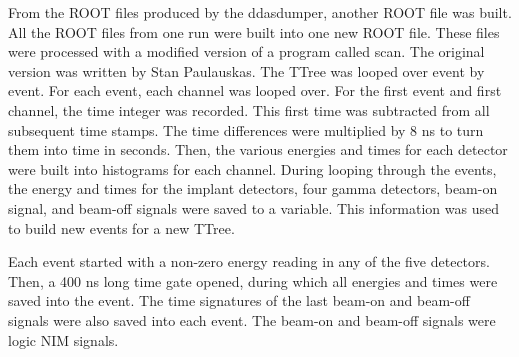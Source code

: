 \documentclass[../MaxHughesThesis.tex]{subfiles}
\begin{document}
From the ROOT files produced by the ddasdumper, another ROOT file was built.
All the ROOT files from one run were built into one new ROOT file. 
These files were processed with a modified version of a program called scan.
The original version was written by Stan Paulauskas.
The TTree was looped over event by event.
For each event, each channel was looped over. 
For the first event and first channel, the time integer was recorded. 
This first time was subtracted from all subsequent time stamps.
The time differences were multiplied by 8 ns to turn them into time in seconds. 
Then, the various energies and times for each detector were built into histograms for each channel. 
During looping through the events, the energy and times for the implant detectors, four gamma detectors, beam-on signal, and beam-off signals were saved to a variable.
This information was used to build new events for a new TTree.

Each event started with a non-zero energy reading in any of the five detectors.
Then, a 400 ns long time gate opened, during which all energies and times were saved into the event.
The time signatures of the last beam-on and beam-off signals were also saved into each event.
The beam-on and beam-off signals were logic NIM signals.
\end{document}
